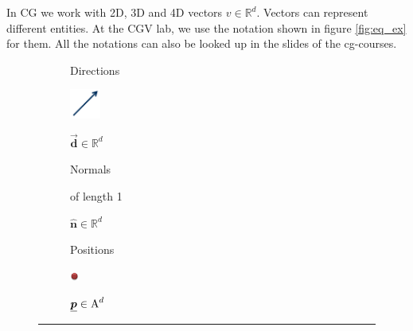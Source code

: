 In CG we work with 2D, 3D and 4D vectors $v \in \mathbb{R}^d$. Vectors can represent different entities. At the \ac{CGV lab}, we use the notation shown in figure \ref{fig:eq_ex} for them. All the notations can also be looked up in the slides of the cg-courses.

\begin{figure}[t]
	\centering
	\begin{subfigure}[t]{0.4\textwidth}
			\centering
			\large
			\begin{bfseries}
			\textcolor{cddarkblue}{Directions} \\
			\end{bfseries}
			\normalsize
			\smallskip
			\includegraphics[width=1cm]{fig/vec.png} \\
			\smallskip
			
			$\bm{\vec{d}} \in \mathbb{R}^d$
	
			\begin{bfseries}
				\textcolor{cddarkblue}{Normals} \\
			\end{bfseries}
			\normalsize
			of length 1
			
			$\bm{\hat{n}} \in \mathbb{R}^d$	
	\end{subfigure}
	{\color{gray!10}\vrule}
	\begin{subfigure}[t]{0.4\textwidth}
			\centering
			\large
			\begin{bfseries}
				\textcolor{cddarkblue}{Positions} \\
			\end{bfseries}
			\normalsize
			\medskip
			\includegraphics[width=0.3cm]{fig/pos.png}
			\medskip
			
			$\bm{\underline{p}} \in \textup{A}^d$
	\end{subfigure}
	
	\bigskip
 	{\color{gray!10}\hrule}
 	\bigskip


\end{figure}
